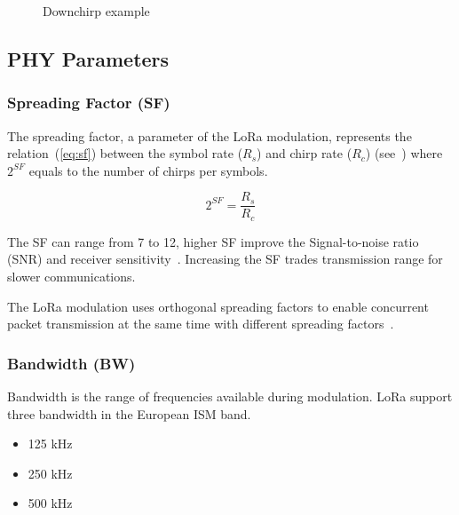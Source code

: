 \begin{figure}[H]
\centering
{} 
\caption{Downchirp example\label{fig:downchirp}}
\end{figure}

\subsection{PHY Parameters}

\subsubsection{Spreading Factor (SF)}

The spreading factor, a parameter of the LoRa modulation, represents the
relation~(\ref{eq:sf}) between the symbol rate ($R_{s}$) and chirp rate ($R_{c}$)
(see~\cite{semtech:modemdesign}) where $2^{SF}$ equals to the number of chirps per
symbols.

\begin{equation}
 \label{eq:sf} 
  2^{SF} = \frac{R_s}{R_c}
\end{equation}

The SF can range from 7 to 12, higher SF improve the Signal-to-noise ratio
(SNR) and receiver sensitivity~\cite{semtech:modemdesign}.
Increasing the SF trades transmission range for slower communications.

The LoRa modulation uses orthogonal spreading factors to enable concurrent
packet transmission at the same time with different
spreading factors~\cite{semtech:modulationbasics}.

\subsubsection{Bandwidth (BW)}

Bandwidth is the range of frequencies available during modulation.
LoRa support three bandwidth in the European ISM band.

\begin{itemize}
    \item 125 kHz
    \item 250 kHz
    \item 500 kHz
\end{itemize}

